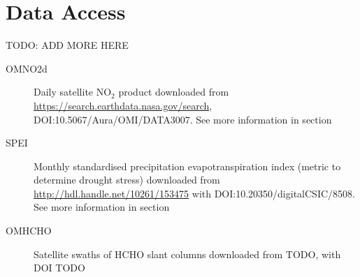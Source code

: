      
\section{Data Access}
TODO: ADD MORE HERE
\label{Model:DataAccess}
\begin{description}
  \item[OMNO2d] Daily satellite NO$_2$ product downloaded from \url{https://search.earthdata.nasa.gov/search}, DOI:10.5067/Aura/OMI/DATA3007. 
  See more information in section %
  
  \item[SPEI] Monthly standardised precipitation evapotranspiration index (metric to determine drought stress) downloaded from \url{http://hdl.handle.net/10261/153475} with DOI:10.20350/digitalCSIC/8508.
  See more information in section %
  
  \item[OMHCHO] Satellite swaths of HCHO slant columns downloaded from TODO, with DOI TODO
  
\end{description}